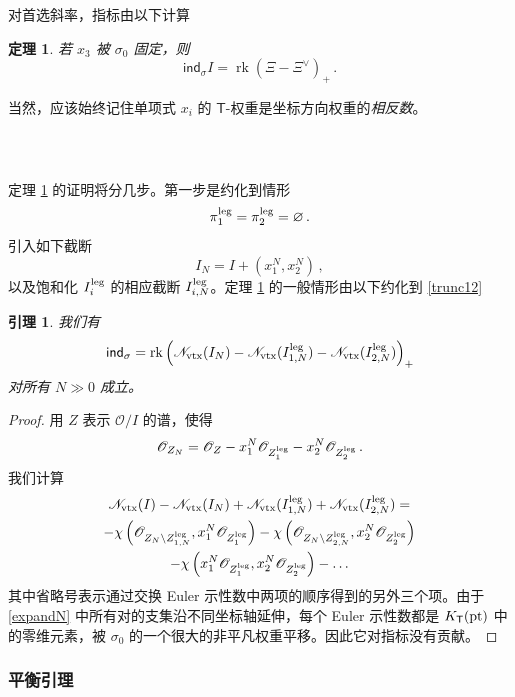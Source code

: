 \documentclass[12pt]{article}
\newcommand{\cO}{\mathscr{O}}
\newcommand{\cN}{\mathscr{N}}
\newcommand{\cNr}{\cN_{\textup{vtx}}}
\DeclareMathOperator{\rk}{rk}
\newcommand{\sind}{\mathsf{ind}}
\newcommand{\bT}{\mathsf{T}}
\newcommand{\pt}{\textup{pt}}
\newtheorem{Theorem}{定理}
\newtheorem{Lemma}{引理}[section]
\theoremstyle{definition}
\begin{document}
对首选斜率，指标由以下计算

\begin{Theorem}\label{t_pref}
若 $x_3$ 被 $\sigma_0$ 固定，则
$$
\sind_{\sigma} I = \rk \left(\Xi - \Xi^{\vee}\right)_{+} \,.
$$
\end{Theorem}

\noindent
当然，应该始终记住单项式 $x_i$ 的 $\bT$-权重是坐标方向权重的\emph{相反数}。

\subsubsection{\ }

定理 \ref{t_pref} 的证明将分几步。第一步是约化到情形
\begin{equation}
\pi^{\textup{leg}}_1=\pi^{\textup{leg}}_2=\varnothing  \,.
\label{trunc12}
\end{equation}
引入如下截断
$$
I_N = I + (x_1^N,x_2^N) \,,
$$
以及饱和化 $I^{\textup{leg}}_i$ 的相应截断 $I^{\textup{leg}}_{i,N}$。定理 \ref{t_pref} 的一般情形由以下约化到 \eqref{trunc12}

\begin{Lemma} 我们有
$$
\sind_{\sigma} =\rk\left( \cNr(I_N) - \cNr(I^{\textup{leg}}_{1,N}) -
 \cNr(I^{\textup{leg}}_{2,N})\right)_{+}
$$
对所有 $N\gg 0$ 成立。
\end{Lemma}

\begin{proof}
用 $Z$ 表示 $\cO/I$ 的谱，使得
$$
\cO_{Z_N} = \cO_Z-x_1^N \cO_{Z^{\textup{leg}}_1} -
x_2^N \cO_{Z^{\textup{leg}}_2} \,.
$$
我们计算
\begin{multline}
 \cNr(I) - \cNr(I_N) + \cNr(I^{\textup{leg}}_{1,N}) +
 \cNr(I^{\textup{leg}}_{2,N})  = \\
-\chi\left(\cO_{Z_N\setminus Z^{\textup{leg}}_{1,N}},
x_1^N \cO_{Z^{\textup{leg}}_{1}}\right) -
\chi\left(\cO_{Z_N\setminus Z^{\textup{leg}}_{2,N}},
x_2^N \cO_{Z^{\textup{leg}}_{2}}\right) \label{expandN} \\ -
\chi\left(x_1^N \cO_{Z^{\textup{leg}}_{1}},
x_2^N \cO_{Z^{\textup{leg}}_{2}}\right) - \dots
\end{multline}
其中省略号表示通过交换 Euler 示性数中两项的顺序得到的另外三个项。由于 \eqref{expandN} 中所有对的支集沿不同坐标轴延伸，每个 Euler 示性数都是 $K_{\bT}(\pt)$ 中的零维元素，被 $\sigma_0$ 的一个很大的非平凡权重平移。因此它对指标没有贡献。
\end{proof}

\subsubsection{平衡引理}\label{s_bal}
\end{document}
